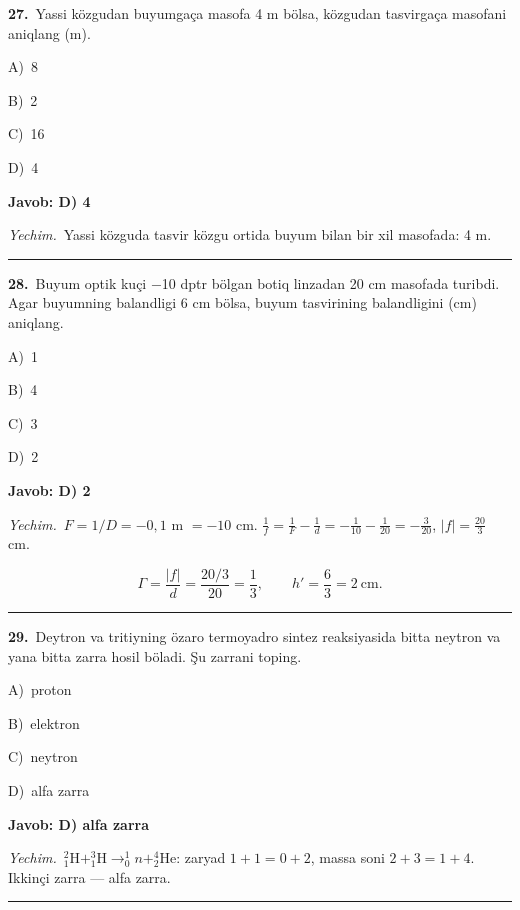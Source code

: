 \documentclass[11pt,a4paper]{article}
\newcommand{\opt}[2]{\hspace*{4mm}#1)\ #2\par}
\begin{document}
\noindent\begin{minipage}{\linewidth}
\textbf{27.}\ Yassi közgudan buyumgaça masofa 4 m bölsa, közgudan tasvirgaça masofani aniqlang (m).\par\smallskip
\opt{A}{8}
\opt{B}{2}
\opt{C}{16}
\opt{D}{4}
\end{minipage}\vspace{2pt}\par
\noindent\colorbox{gray!12}{\parbox{\dimexpr\linewidth-2\fboxsep}{\textbf{Javob: D) 4}}}\par\smallskip
\noindent\textit{Yechim.}\ Yassi közguda tasvir közgu ortida buyum bilan bir xil masofada: 4 m.\par\par\medskip\hrule\medskip
{}\noindent\begin{minipage}{\linewidth}
\textbf{28.}\ Buyum optik kuçi $-$10 dptr bölgan botiq linzadan 20 cm masofada turibdi. Agar buyumning balandligi 6 cm bölsa, buyum tasvirining balandligini (cm) aniqlang.\par\smallskip
\opt{A}{1}
\opt{B}{4}
\opt{C}{3}
\opt{D}{2}
\end{minipage}\vspace{2pt}\par
\noindent\colorbox{gray!12}{\parbox{\dimexpr\linewidth-2\fboxsep}{\textbf{Javob: D) 2}}}\par\smallskip
\noindent\textit{Yechim.}\ $F=1/D=-0{,}1$ m $=-10$ cm. $\frac1f=\frac1F-\frac1d=-\frac1{10}-\frac1{20}=-\frac{3}{20}$, $|f|=\frac{20}{3}$ cm.\par
\[\Gamma=\frac{|f|}{d}=\frac{20/3}{20}=\frac13,\qquad h'=\frac63=2\ \text{cm}.\]\par\medskip\hrule\medskip
{}\noindent\begin{minipage}{\linewidth}
\textbf{29.}\ Deytron va tritiyning özaro termoyadro sintez reaksiyasida bitta neytron va yana bitta zarra hosil böladi. Şu zarrani toping.\par\smallskip
\opt{A}{proton}
\opt{B}{elektron}
\opt{C}{neytron}
\opt{D}{alfa zarra}
\end{minipage}\vspace{2pt}\par
\noindent\colorbox{gray!12}{\parbox{\dimexpr\linewidth-2\fboxsep}{\textbf{Javob: D) alfa zarra}}}\par\smallskip
\noindent\textit{Yechim.}\ $^2_1\mathrm H+^3_1\mathrm H\to^1_0n+^4_2\mathrm{He}$: zaryad $1+1=0+2$, massa soni $2+3=1+4$. Ikkinçi zarra — alfa zarra.\par\par\medskip\hrule\medskip
\end{document}
